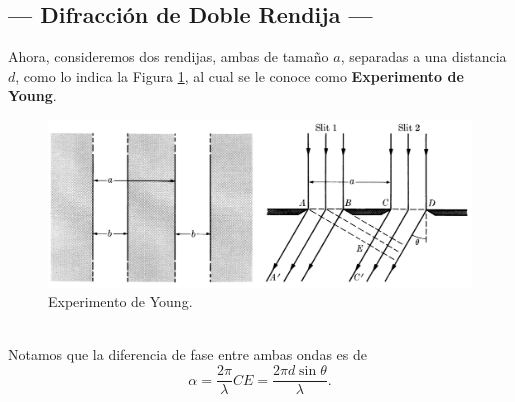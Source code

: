 \documentclass[12pt,a4paper]{article}
\begin{document}
\subsection{--- Difracción de Doble Rendija ---} %
\label{sub:difraccion_dos}
Ahora, consideremos dos rendijas, ambas de tamaño \(a\), separadas a una distancia \(d\), como lo indica la Figura \ref{fig:exp_young}, al cual se le conoce como \textbf{Experimento de Young}.
\begin{figure}[hbt!]
	\centering
	\includegraphics[width= \linewidth]{1_INTRO/dos_rendijas.png}
	\caption{Experimento de Young.}
	\label{fig:exp_young}
\end{figure}\\
Notamos que la diferencia de fase entre ambas ondas es de
\[
	\alpha = \dfrac{2 \pi}{\lambda} CE = \dfrac{2 \pi d \sin \theta}{\lambda}.
\]
\end{document}
